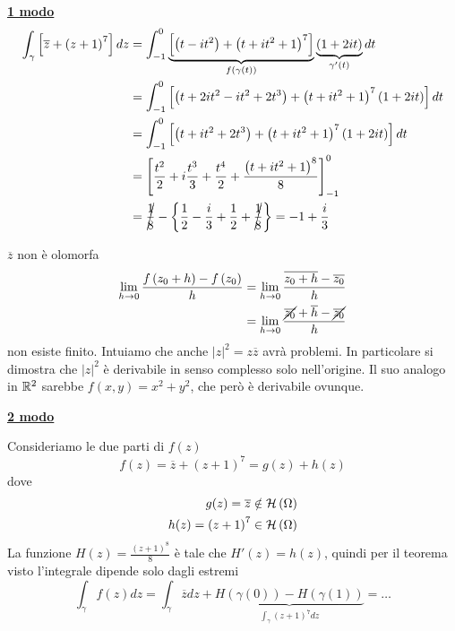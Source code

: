 \textbf{\underline{1 modo}}
\begin{align*}
\int\nolimits_{\gamma}\left[\overline{z} + \left(z + 1\right)^{7}\right] dz & = \int\nolimits^{0}_{- 1}\underbrace{\left[\left(t - it^{2}\right) + \left(t + it^{2} + 1\right)^{7}\right]}_{f\left(\gamma (t)\right)}\underbrace{\left(1 + 2it\right)}_{\gamma '(t)} dt\\
 & = \int\nolimits^{0}_{- 1}\left[\left(t + 2it^{2} - it^{2} + 2t^{3}\right) + \left(t + it^{2} + 1\right)^{7}\left(1 + 2it\right)\right] dt\\
 & = \int\nolimits^{0}_{- 1}\left[\left(t + it^{2} + 2t^{3}\right) + \left(t + it^{2} + 1\right)^{7}\left(1 + 2it\right)\right] dt\\
 & = \left[\frac{t^{2}}{2} + i\frac{t^{3}}{3} + \frac{t^{4}}{2} + \frac{\left(t + it^{2} + 1\right)^{8}}{8}\right]^{0}_{- 1}\\
 & = \cancel{\frac{1}{8}} - \left\{\frac{1}{2} - \frac{i}{3} + \frac{1}{2} + \cancel{\frac{1}{8}}\right\} = - 1 + \frac{i}{3}
\end{align*}
\begin{rem}
$\overline{z}$ non è olomorfa
\begin{align*}
\lim\limits_{h\rightarrow 0}\frac{f\left(z_{0} + h\right) - f\left(z_{0}\right)}{h} & = \lim\limits_{h\rightarrow 0}\frac{\overline{z_{0} + h} - \overline{z_{0}}}{h}\\
 & = \lim\limits_{h\rightarrow 0}\frac{\cancel{\overline{z_{0}}} + \overline{h} - \cancel{\overline{z_{0}}}}{h}
\end{align*}
non esiste finito. Intuiamo che anche $\left| z\right|^{2} = z\overline{z}$ avrà problemi. In particolare si dimostra che $\left| z\right|^{2}$ è derivabile in senso complesso solo nell'origine. Il suo analogo in $\mathbb{R}^{2}$ sarebbe $f\left(x, y\right) = x^{2} + y^{2}$, che però è derivabile ovunque.
\end{rem}
\textbf{\underline{2 modo}}

Consideriamo le due parti di $f(z)$
\begin{equation*}
f(z) = \overline{z} + \left(z + 1\right)^{7} = g(z) + h(z)
\end{equation*}
dove
\begin{equation*}
\begin{aligned}
g(z) = \overline{z} & \notin \mathcal{H} \left(\Omega \right)\\
h(z) = \left(z + 1\right)^{7} & \in \mathcal{H} \left(\Omega \right)
\end{aligned}
\end{equation*}
La funzione $H(z) = \frac{\left(z + 1\right)^{8}}{8}$ è tale che $H'(z) = h(z)$, quindi per il teorema visto l'integrale dipende solo dagli estremi
\begin{equation*}
\int\nolimits_{\gamma} f(z) dz = \int\nolimits_{\gamma}\overline{z} dz + \underbrace{H\left(\gamma (0)\right) - H\left(\gamma (1)\right)}_{\int\nolimits_{\gamma}\left(z + 1\right)^{7} dz} = \dotsc
\end{equation*}
\Soluzione

